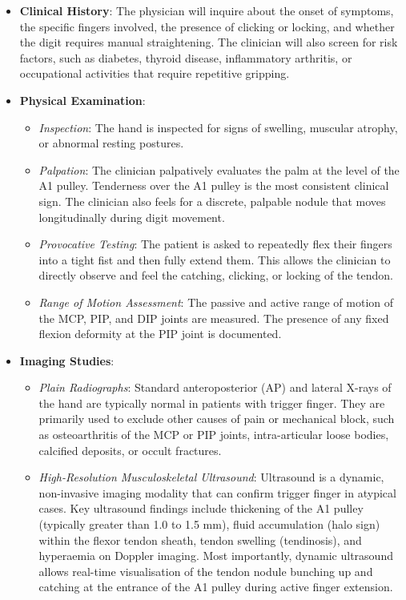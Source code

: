 \begin{itemize}
  \item \textbf{Clinical History}: The physician will inquire about the onset of symptoms, the specific fingers involved, the presence of clicking or locking, and whether the digit requires manual straightening. The clinician will also screen for risk factors, such as diabetes, thyroid disease, inflammatory arthritis, or occupational activities that require repetitive gripping.
  \item \textbf{Physical Examination}:
  \begin{itemize}
    \item \textit{Inspection}: The hand is inspected for signs of swelling, muscular atrophy, or abnormal resting postures.
    \item \textit{Palpation}: The clinician palpatively evaluates the palm at the level of the A1 pulley. Tenderness over the A1 pulley is the most consistent clinical sign. The clinician also feels for a discrete, palpable nodule that moves longitudinally during digit movement.
    \item \textit{Provocative Testing}: The patient is asked to repeatedly flex their fingers into a tight fist and then fully extend them. This allows the clinician to directly observe and feel the catching, clicking, or locking of the tendon.
    \item \textit{Range of Motion Assessment}: The passive and active range of motion of the MCP, PIP, and DIP joints are measured. The presence of any fixed flexion deformity at the PIP joint is documented.
  \end{itemize}
  \item \textbf{Imaging Studies}:
  \begin{itemize}
    \item \textit{Plain Radiographs}: Standard anteroposterior (AP) and lateral X-rays of the hand are typically normal in patients with trigger finger. They are primarily used to exclude other causes of pain or mechanical block, such as osteoarthritis of the MCP or PIP joints, intra-articular loose bodies, calcified deposits, or occult fractures.
    \item \textit{High-Resolution Musculoskeletal Ultrasound}: Ultrasound is a dynamic, non-invasive imaging modality that can confirm trigger finger in atypical cases. Key ultrasound findings include thickening of the A1 pulley (typically greater than 1.0 to 1.5 mm), fluid accumulation (halo sign) within the flexor tendon sheath, tendon swelling (tendinosis), and hyperaemia on Doppler imaging. Most importantly, dynamic ultrasound allows real-time visualisation of the tendon nodule bunching up and catching at the entrance of the A1 pulley during active finger extension.

\end{itemize}
\end{itemize}
